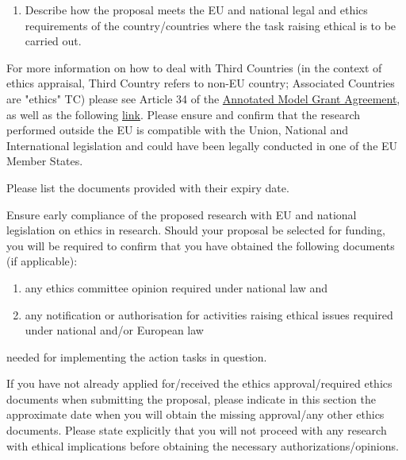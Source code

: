 {\bf
\begin{enumerate}[leftmargin=*, label=\arabic*)]
  \item Describe how the proposal meets the EU and national legal and ethics requirements of the country/countries where the task raising ethical is to be carried out.
\end{enumerate}
}

\medskip\noindent
For more information on how to deal with Third Countries (in the context of ethics
appraisal, Third Country refers to non-EU country; Associated Countries are "ethics"
TC) please see Article 34 of the \href{http://ec.europa.eu/research/participants/data/ref/h2020/grants_manual/amga/h2020-amga_en.pdf}{Annotated Model Grant Agreement},
as well as the following \href{http://ec.europa.eu/justice/data-protection/international-transfers/adequacy/index_en.htm}{link}.
Please ensure and confirm that the research performed outside the EU
is compatible with the Union, National and International legislation and could have
been legally conducted in one of the EU Member States.

\medskip\noindent
Please list the documents provided with their expiry date.

\medskip\noindent
Ensure early compliance of the proposed research with EU and national legislation on ethics in research.
Should your proposal be selected for funding, 
you will be required to confirm that you have obtained the following documents (if applicable):

\begin{enumerate}[label=(\alph*)]
  \item any ethics committee opinion required under national law and
  \item any notification or authorisation for activities raising ethical issues required under national and/or European law
\end{enumerate}

\noindent
needed for implementing the action tasks in question.

\medskip\noindent
If you have not already applied for/received the ethics approval/required ethics documents when submitting the proposal, 
please indicate in this section the approximate date when you will obtain the missing approval/any other ethics documents. 
Please state explicitly that you will not proceed with any research with ethical implications before 
obtaining the necessary authorizations/opinions.

\medskip\noindent
{}

